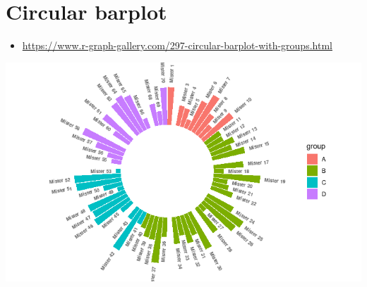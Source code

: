 \documentclass[
]{book}
\providecommand{\tightlist}{%
  \setlength{\itemsep}{0pt}\setlength{\parskip}{0pt}}
\begin{document}
\hypertarget{circular-barplot}{%
\section{Circular barplot}\label{circular-barplot}}

\begin{itemize}
\tightlist
\item
  \url{https://www.r-graph-gallery.com/297-circular-barplot-with-groups.html}
\end{itemize}

\includegraphics{images/10/000002.png}
\end{document}
